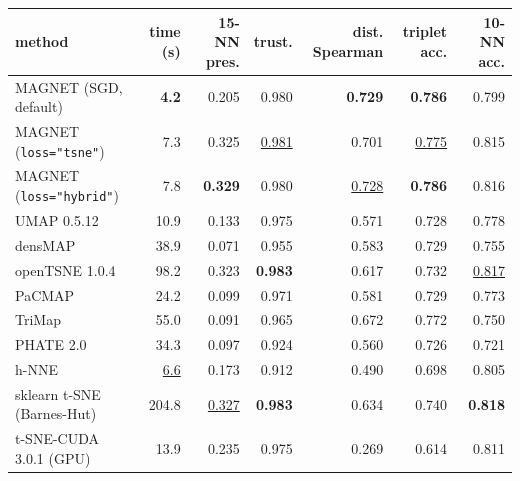 \begin{tabular}{lrrrrrr}
\toprule
method & time (s) & 15-NN pres. & trust. & dist. Spearman & triplet acc. & 10-NN acc. \\
\midrule
MAGNET (SGD, default) & \textbf{4.2} & 0.205 & 0.980 & \textbf{0.729} & \textbf{0.786} & 0.799 \\
MAGNET (\texttt{loss="tsne"}) & 7.3 & 0.325 & \underline{0.981} & 0.701 & \underline{0.775} & 0.815 \\
MAGNET (\texttt{loss="hybrid"}) & 7.8 & \textbf{0.329} & 0.980 & \underline{0.728} & \textbf{0.786} & 0.816 \\
UMAP 0.5.12 & 10.9 & 0.133 & 0.975 & 0.571 & 0.728 & 0.778 \\
densMAP  & 38.9 & 0.071 & 0.955 & 0.583 & 0.729 & 0.755 \\
openTSNE 1.0.4 & 98.2 & 0.323 & \textbf{0.983} & 0.617 & 0.732 & \underline{0.817} \\
PaCMAP & 24.2 & 0.099 & 0.971 & 0.581 & 0.729 & 0.773 \\
TriMap & 55.0 & 0.091 & 0.965 & 0.672 & 0.772 & 0.750 \\
PHATE 2.0 & 34.3 & 0.097 & 0.924 & 0.560 & 0.726 & 0.721 \\
h-NNE & \underline{6.6} & 0.173 & 0.912 & 0.490 & 0.698 & 0.805 \\
sklearn t-SNE (Barnes-Hut) & 204.8 & \underline{0.327} & \textbf{0.983} & 0.634 & 0.740 & \textbf{0.818} \\
t-SNE-CUDA 3.0.1 (GPU) & 13.9 & 0.235 & 0.975 & 0.269 & 0.614 & 0.811 \\
\bottomrule
\end{tabular}

